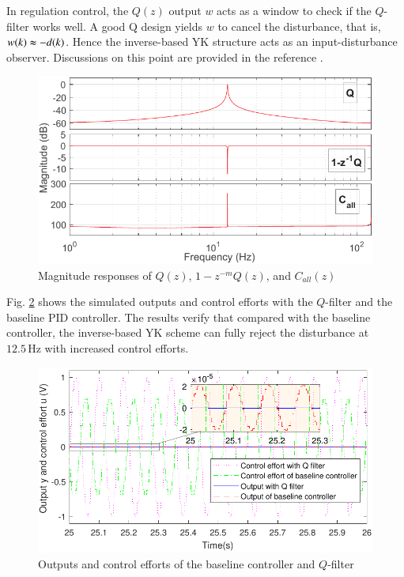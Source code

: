\documentclass [11pt, proquest] {uwthesis}[2020/02/24]
\begin{document}
In regulation control, the $Q(z)$ output $w$ acts as a window to
check if the $Q$-filter works well. A good Q design yields $w$ to
cancel the disturbance, that is, $w(k)\thickapprox-d(k)$. Hence the
inverse-based YK structure acts as an input-disturbance observer.
Discussions on this point are provided in the reference \cite{chen2014new}.
\begin{figure}[!ht]
\begin{centering}
\includegraphics[width=13cm]{Loop-shaping/Q_and_one_minus_zinvQ_2}
\par\end{centering}
\caption{\label{fig:Magnitude-responses-of-LS}Magnitude responses of $Q(z)$,
$1-z^{-m}Q(z)$, and $C_{all}(z)$}
\end{figure}

Fig. \ref{fig:Output-of-the} shows the simulated outputs and control
efforts with the $Q$-filter and the baseline PID controller. The
results verify that compared with the baseline controller, the inverse-based
YK scheme can fully reject the disturbance at $12.5\,\text{Hz}$ with
increased control efforts.
\begin{figure}[!ht]
\begin{centering}
\includegraphics[width=13cm]{Loop-shaping/Q_output_3}
\par\end{centering}
\caption{\label{fig:Output-of-the}Outputs and control efforts of the baseline
controller and $Q$-filter}
\end{figure}
\end{document}
